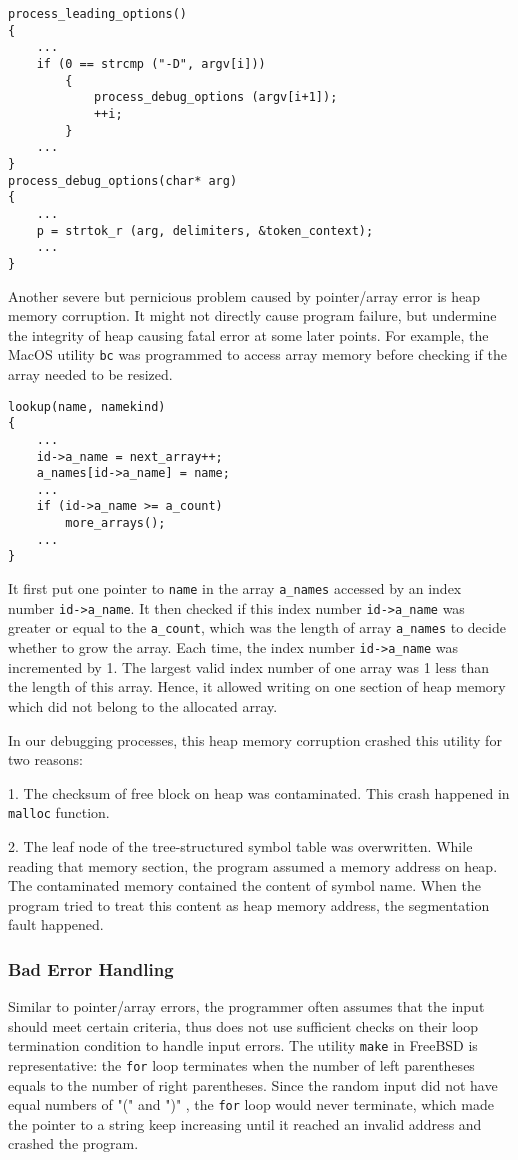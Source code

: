 \begin{verbatim}
process_leading_options()
{
    ...
    if (0 == strcmp ("-D", argv[i]))
        {
            process_debug_options (argv[i+1]);
            ++i; 
        }
    ...
}
process_debug_options(char* arg)
{
    ...
    p = strtok_r (arg, delimiters, &token_context);
    ...
}
\end{verbatim}


Another severe but pernicious problem caused by pointer/array error is heap memory corruption. It might not directly cause program failure, but undermine the integrity of heap causing fatal error at some later points. For example, the MacOS utility \texttt{bc} was programmed to access array memory before checking if the array needed to be resized. 

\begin{verbatim}
lookup(name, namekind)
{
    ...
    id->a_name = next_array++;
    a_names[id->a_name] = name;
    ...
    if (id->a_name >= a_count)
	    more_arrays();
    ...
}
\end{verbatim}

It first put one pointer to \texttt{name} in the array \texttt{a\_names} accessed by an index number \texttt{id->a\_name}. It then checked if this index number \texttt{id->a\_name} was greater or equal to the \texttt{a\_count}, which was the length of array \texttt{a\_names} to decide whether to grow the array. Each time, the index number \texttt{id->a\_name} was incremented by 1. The largest valid index number of one array was 1 less than the length of this array. Hence, it allowed writing on one section of heap memory which did not belong to the allocated array. 

In our debugging processes, this heap memory corruption crashed this utility for two reasons: 

1. The checksum of free block on heap was contaminated. This crash happened in \texttt{malloc} function. 

2. The leaf node of the tree-structured symbol table was overwritten. While reading that memory section, the program assumed a memory address on heap. The contaminated memory contained the content of symbol name. When the program tried to treat this content as heap memory address, the segmentation fault happened.



\subsubsection{Bad Error Handling}
Similar to pointer/array errors, the programmer often assumes that the input should meet certain criteria, thus does not use sufficient checks on their loop termination condition to handle input errors. The utility \texttt{make} in FreeBSD is representative: the \texttt{for} loop terminates when the number of left parentheses equals to the number of right parentheses. Since the random input did not have equal numbers of "(" and ")" , the \texttt{for} loop would never terminate, which made the pointer to a string keep increasing until it reached an invalid address and crashed the program.


